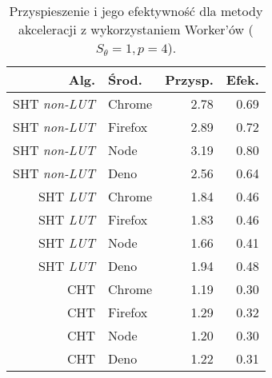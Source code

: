 \begin{wraptable}{r}{7.9cm}
    \caption{Przyspieszenie i jego efektywność dla metody akceleracji z wykorzystaniem Worker'ów \mbox{($S_\theta = 1, p = 4$)}.}
    \label{tab:speedup}
    \begin{tabular}{rlrr}%
        \hline
        Alg.                 & Środ.   & Przysp. & Efek. \\
        \hline
        SHT \textit{non-LUT} & Chrome  & 2.78    & 0.69  \\
        SHT \textit{non-LUT} & Firefox & 2.89    & 0.72  \\
        SHT \textit{non-LUT} & Node    & 3.19    & \textcolor{green!70!black}{0.80}  \\
        SHT \textit{non-LUT} & Deno    & 2.56    & \textcolor{red!70!black}{0.64}  \\
        \hline
        SHT \textit{LUT}     & Chrome  & 1.84    & 0.46  \\
        SHT \textit{LUT}     & Firefox & 1.83    & 0.46  \\
        SHT \textit{LUT}     & Node    & 1.66    & \textcolor{red!70!black}{0.41}  \\
        SHT \textit{LUT}     & Deno    & 1.94    & \textcolor{green!70!black}{0.48}  \\
        \hline
        CHT                  & Chrome  & 1.19    & \textcolor{red!70!black}{0.30} \\
        CHT                  & Firefox & 1.29    & \textcolor{green!70!black}{0.32}  \\
        CHT                  & Node    & 1.20    & \textcolor{red!70!black}{0.30}  \\
        CHT                  & Deno    & 1.22    & 0.31  \\
        \hline
    \end{tabular}
\end{wraptable}
